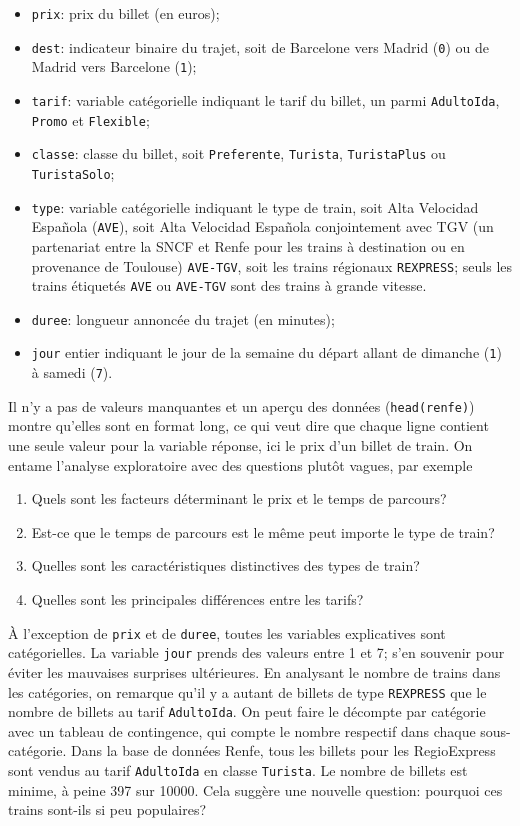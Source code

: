 \documentclass[
  11pt,
  letterpaper,
]{book}
\providecommand{\tightlist}{%
  \setlength{\itemsep}{0pt}\setlength{\parskip}{0pt}}
\theoremstyle{definition}
\theoremstyle{definition}
\theoremstyle{definition}
\theoremstyle{remark}
\begin{document}
\begin{itemize}
\tightlist
\item
  \texttt{prix}: prix du billet (en euros);
\item
  \texttt{dest}: indicateur binaire du trajet, soit de Barcelone vers Madrid (\texttt{0}) ou de Madrid vers Barcelone (\texttt{1});
\item
  \texttt{tarif}: variable catégorielle indiquant le tarif du billet, un parmi \texttt{AdultoIda}, \texttt{Promo} et \texttt{Flexible};
\item
  \texttt{classe}: classe du billet, soit \texttt{Preferente}, \texttt{Turista}, \texttt{TuristaPlus} ou \texttt{TuristaSolo};
\item
  \texttt{type}: variable catégorielle indiquant le type de train, soit Alta Velocidad Española (\texttt{AVE}), soit Alta Velocidad Española conjointement avec TGV (un partenariat entre la SNCF et Renfe pour les trains à destination ou en provenance de Toulouse) \texttt{AVE-TGV}, soit les trains régionaux \texttt{REXPRESS}; seuls les trains étiquetés \texttt{AVE} ou \texttt{AVE-TGV} sont des trains à grande vitesse.
\item
  \texttt{duree}: longueur annoncée du trajet (en minutes);
\item
  \texttt{jour} entier indiquant le jour de la semaine du départ allant de dimanche (\texttt{1}) à samedi (\texttt{7}).
\end{itemize}

Il n'y a pas de valeurs manquantes et un aperçu des données (\texttt{head(renfe)}) montre qu'elles sont en format long, ce qui veut dire que chaque ligne contient une seule valeur pour la variable réponse, ici le prix d'un billet de train. On entame l'analyse exploratoire avec des questions plutôt vagues, par exemple

\begin{enumerate}
\def\labelenumi{\arabic{enumi}.}
\tightlist
\item
  Quels sont les facteurs déterminant le prix et le temps de parcours?
\item
  Est-ce que le temps de parcours est le même peut importe le type de train?
\item
  Quelles sont les caractéristiques distinctives des types de train?
\item
  Quelles sont les principales différences entre les tarifs?
\end{enumerate}

À l'exception de \texttt{prix} et de \texttt{duree}, toutes les variables explicatives sont catégorielles. La variable \texttt{jour} prends des valeurs entre 1 et 7; s'en souvenir pour éviter les mauvaises surprises ultérieures.
En analysant le nombre de trains dans les catégories, on remarque qu'il y a autant de billets de type \texttt{REXPRESS} que le nombre de billets au tarif \texttt{AdultoIda}. On peut faire le décompte par catégorie avec un tableau de contingence, qui compte le nombre respectif dans chaque sous-catégorie. Dans la base de données Renfe, tous les billets pour les RegioExpress sont vendus au tarif \texttt{AdultoIda} en classe \texttt{Turista}. Le nombre de billets est minime, à peine 397 sur 10000. Cela suggère une nouvelle question: pourquoi ces trains sont-ils si peu populaires?
\end{document}
